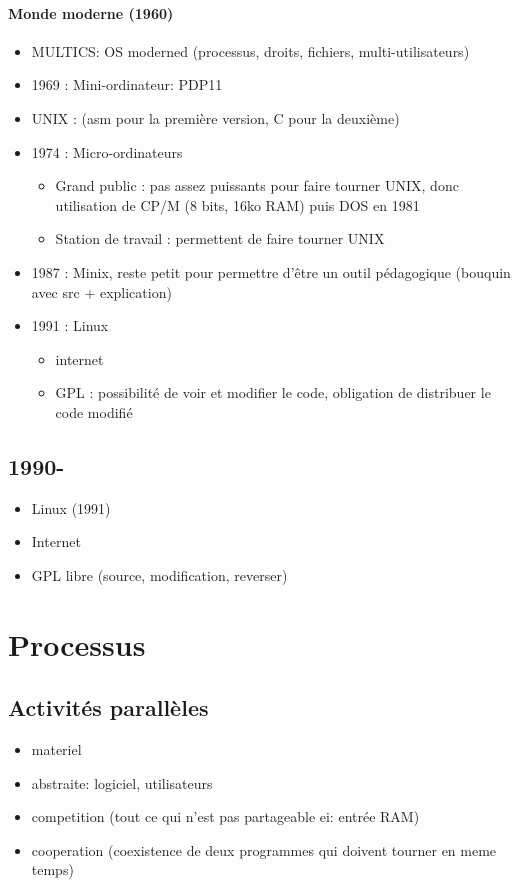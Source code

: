\documentclass[11pt]{article}
\begin{document}
\paragraph{Monde moderne (1960)}
\begin{itemize}
	\item MULTICS: OS moderned (processus, droits, fichiers, multi-utilisateurs)
	\item 1969 : Mini-ordinateur: PDP11
	\item UNIX : (asm pour la première version, C pour la deuxième)
	\item 1974 : Micro-ordinateurs
	      \begin{itemize}
		      \item Grand public : pas assez puissants pour faire tourner UNIX, donc utilisation de CP/M (8 bits, 16ko RAM) puis DOS en 1981
		      \item Station de travail : permettent de faire tourner UNIX
	      \end{itemize}
	\item 1987 : Minix, reste petit pour permettre d'être un outil pédagogique (bouquin avec src + explication)
	\item 1991 : Linux \begin{itemize}
		      \item internet
		      \item GPL : possibilité de voir et modifier le code, obligation de distribuer le code modifié
	      \end{itemize}

\end{itemize}

\subsection{1990-}
\begin{itemize}
	\item Linux (1991)
	\item Internet
	\item GPL libre (source, modification, reverser)
\end{itemize}

\pagebreak

\section{Processus}
\subsection{Activités parallèles}
\begin{itemize}
	\item materiel
	\item abstraite: logiciel, utilisateurs
	\item competition (tout ce qui n'est pas partageable ei: entrée RAM)
	\item cooperation (coexistence de deux programmes qui doivent tourner en meme temps)
\end{itemize}
\end{document}
